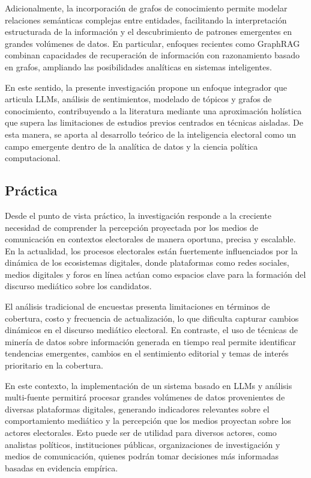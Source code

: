 Adicionalmente, la incorporación de grafos de conocimiento permite modelar relaciones semánticas complejas entre entidades, facilitando la interpretación estructurada de la información y el descubrimiento de patrones emergentes en grandes volúmenes de datos. En particular, enfoques recientes como GraphRAG combinan capacidades de recuperación de información con razonamiento basado en grafos, ampliando las posibilidades analíticas en sistemas inteligentes.

En este sentido, la presente investigación propone un enfoque integrador que articula LLMs, análisis de sentimientos, modelado de tópicos y grafos de conocimiento, contribuyendo a la literatura mediante una aproximación holística que supera las limitaciones de estudios previos centrados en técnicas aisladas. De esta manera, se aporta al desarrollo teórico de la inteligencia electoral como un campo emergente dentro de la analítica de datos y la ciencia política computacional.

\subsection{Práctica}

Desde el punto de vista práctico, la investigación responde a la creciente necesidad de comprender la percepción proyectada por los medios de comunicación en contextos electorales de manera oportuna, precisa y escalable. En la actualidad, los procesos electorales están fuertemente influenciados por la dinámica de los ecosistemas digitales, donde plataformas como redes sociales, medios digitales y foros en línea actúan como espacios clave para la formación del discurso mediático sobre los candidatos.

El análisis tradicional de encuestas presenta limitaciones en términos de cobertura, costo y frecuencia de actualización, lo que dificulta capturar cambios dinámicos en el discurso mediático electoral. En contraste, el uso de técnicas de minería de datos sobre información generada en tiempo real permite identificar tendencias emergentes, cambios en el sentimiento editorial y temas de interés prioritario en la cobertura.

En este contexto, la implementación de un sistema basado en LLMs y análisis multi-fuente permitirá procesar grandes volúmenes de datos provenientes de diversas plataformas digitales, generando indicadores relevantes sobre el comportamiento mediático y la percepción que los medios proyectan sobre los actores electorales. Esto puede ser de utilidad para diversos actores, como analistas políticos, instituciones públicas, organizaciones de investigación y medios de comunicación, quienes podrán tomar decisiones más informadas basadas en evidencia empírica.

